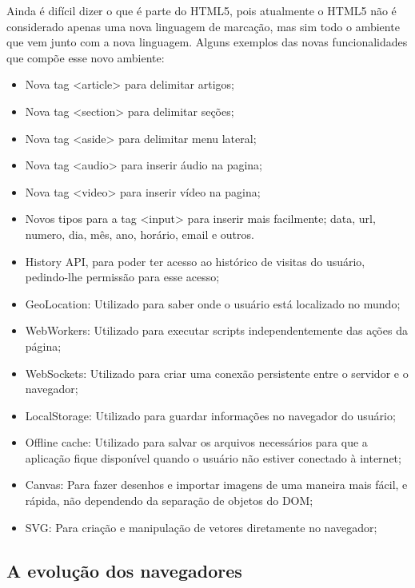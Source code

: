 Ainda é difícil dizer o que é parte do HTML5, pois atualmente o HTML5
não é considerado apenas uma nova linguagem de marcação, mas sim todo
o ambiente que vem junto com a nova linguagem. Alguns exemplos das novas
funcionalidades que compõe esse novo ambiente:
\begin{itemize}
  \item Nova tag <article> para delimitar artigos;
  \item Nova tag <section> para delimitar seções;
  \item Nova tag <aside> para delimitar menu lateral;
  \item Nova tag <audio> para inserir áudio na pagina;
  \item Nova tag <video> para inserir vídeo na pagina;
  \item Novos tipos para a tag <input> para inserir mais facilmente;
  data, url, numero, dia, mês, ano, horário, email e outros.
  \item History API, para poder ter acesso ao histórico de visitas do
  usuário, pedindo-lhe permissão para esse acesso;
  \item GeoLocation: Utilizado para saber onde o usuário está localizado no
  mundo;
  \item WebWorkers: Utilizado para executar scripts independentemente das ações
  da página;
  \item WebSockets: Utilizado para criar uma conexão persistente entre
  o servidor e o navegador;
  \item LocalStorage: Utilizado para guardar informações no navegador
  do usuário;
  \item Offline cache: Utilizado para salvar os arquivos necessários
  para que a aplicação fique disponível quando o usuário não estiver
  conectado à internet;
  \item Canvas: Para fazer desenhos e importar imagens de uma maneira
  mais fácil, e rápida, não dependendo da separação de objetos do DOM;
  \item SVG: Para criação e manipulação de vetores diretamente no
  navegador;
\end{itemize}

\subsection{A evolução dos navegadores}


